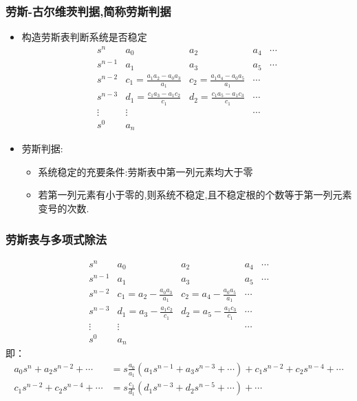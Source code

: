 \documentclass{article}
\begin{document}
\begin{frame}
\frametitle{劳斯-古尔维茨判据,简称劳斯判据}
\label{sec-2-2-3}

\begin{itemize}
\item <2->构造劳斯表判断系统是否稳定
      \begin{equation*}
      \begin{matrix}
      s^{n}   &  a_{0}  &  a_{2}  & a_{4}  & \cdots  \\
      s^{n-1} &  a_{1}  & a_{3}   & a_{5}  & \cdots  \\
      s^{n-2} &  c_{1}=\frac{a_1 a_2 - a_0 a_3}{a_1} &  c_{2}=\frac{a_1 a_4 - a_0 a_5}{a_1} & \cdots \\
      s^{n-3} &  d_{1}=\frac{c_1 a_3 - a_1 c_2}{c_1} &  d_{2}=\frac{c_1 a_5 - a_1 c_3}{c_1} & \cdots \\
      \vdots  &   \vdots                             &                                      & \cdots  \\
      s^{0}   &   a_{n}                              &                                      &
      \end{matrix}
      \end{equation*}
\item <3->劳斯判据:
\begin{itemize}
\item <4->系统稳定的充要条件:劳斯表中第一列元素均大于零
\item <5->若第一列元素有小于零的,则系统不稳定,且不稳定根的个数等于第一列元素变号的次数.
\end{itemize}
\end{itemize}
\end{frame}
\begin{frame}
\frametitle{劳斯表与多项式除法}
\label{sec-2-2-4}

\begin{equation*}
     \begin{matrix}
     s^{n}   &  a_{0}  &  a_{2}  & a_{4}  & \cdots  \\
     s^{n-1} &  a_{1}  & a_{3}   & a_{5}  & \cdots  \\
     s^{n-2} &  c_{1}=a_2 -\frac{ a_0 a_3}{a_1} &  c_{2}=a_4 - \frac{a_0 a_5}{a_1} & \cdots \\
     s^{n-3} &  d_{1}=a_3 -\frac{ a_1 c_2}{c_1} &  d_{2}=a_5 -\frac{ a_1 c_3}{c_1} & \cdots \\
     \vdots  &   \vdots                             &                                      & \cdots  \\
     s^{0}   &   a_{n}                              &                                      &
     \end{matrix}
\end{equation*}
即：
\begin{align*}
    a_0 s^n+a_2 s^{n-2}+\cdots &= s \frac{a_0}{a_1}(a_1 s^{n-1}+a_3 s^{n-3}+\cdots)+c_1 s^{n-2}+c_2 s^{n-4}+\cdots\\
    c_1 s^{n-2}+c_2 s^{n-4}+\cdots &=s \frac{c_1}{d_1}(d_1 s^{n-3}+d_2 s^{n-5}+\cdots)+\cdots
\end{align*}
\end{frame}
\end{document}

